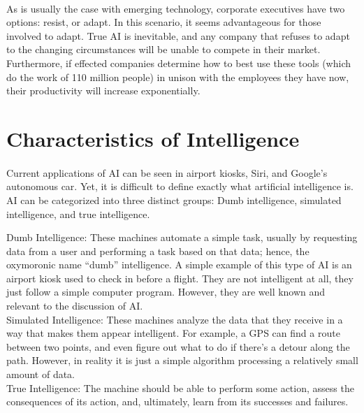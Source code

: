 \documentclass{article}
\newenvironment{myindentpar}[1]
 {\begin{list}{}
         {\setlength{\leftmargin}{#1}}
         \item[]
 }
 {\end{list}}
\begin{document}
    \paragraph{}
      As is usually the case with emerging technology, corporate executives have
      two options: resist, or adapt. In this scenario, it seems advantageous for
      those involved to adapt. True AI is inevitable, and any company that
      refuses to adapt to the changing circumstances will be unable to compete
      in their market. Furthermore, if effected companies determine how to best
      use these tools (which do the work of 110 million people) in unison
      with the employees they have now, their productivity will increase exponentially.

  \section{Characteristics of Intelligence}

    \paragraph{}
      Current applications of AI can be seen in airport kiosks, Siri, and Google's
      autonomous car. Yet, it is difficult to define exactly what artificial
      intelligence is. AI can be categorized into three distinct groups: Dumb
      intelligence, simulated intelligence, and true intelligence.\\

    \begin{myindentpar}{1cm}
      Dumb Intelligence: These machines automate a simple task, usually by requesting
      data from a user and performing a task based on that data; hence, the
      oxymoronic name ``dumb'' intelligence. A simple example of this type of AI
      is an airport kiosk used to check in before a flight. They are not intelligent at all,
      they just follow a simple computer program. However, they are well known
      and relevant to the discussion of AI.\\

      Simulated Intelligence: These machines analyze the data that they
      receive in a way that makes them appear intelligent.
      For example, a GPS can find a route between two points, and even figure out what
      to do if there's a detour along the path. However, in reality it is just a
      simple algorithm processing a relatively small amount of data.\\

      True Intelligence: The machine should be able to perform some action,
      assess the consequences of its action, and, ultimately, learn from its
      successes and failures.
    \end{myindentpar}
\end{document}
